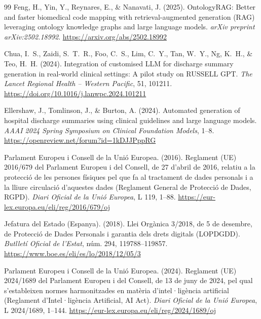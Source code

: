 \documentclass[CAT]{TFUOC}%
\begin{document}
\begin{thebibliography}{99}
Feng, H., Yin, Y., Reynares, E., \& Nanavati, J. (2025).
\newblock OntologyRAG: Better and faster biomedical code mapping with retrieval-augmented generation (RAG) leveraging ontology knowledge graphs and large language models.
\newblock \textit{arXiv preprint arXiv:2502.18992}.
\newblock \url{https://arxiv.org/abs/2502.18992}


Chua, I.~S., Zaidi, S.~T.~R., Foo, C.~S., Lim, C.~Y.,
Tan, W.~Y., Ng, K.~H., \& Teo, H.~H. (2024).
\newblock Integration of customised LLM for discharge summary
generation in real-world clinical settings: A pilot study
on RUSSELL GPT.
\newblock \textit{The Lancet Regional Health -- Western
Pacific}, 51, 101211.
\newblock \url{https://doi.org/10.1016/j.lanwpc.2024.101211}

Ellershaw, J., Tomlinson, J., \& Burton, A. (2024).
\newblock Automated generation of hospital discharge summaries
using clinical guidelines and large language models.
\newblock \textit{AAAI 2024 Spring Symposium on Clinical
Foundation Models}, 1--8.
\newblock \url{https://openreview.net/forum?id=1kDJJPppRG}


Parlament Europeu i Consell de la Unió Europea. (2016).
\newblock Reglament (UE) 2016/679 del Parlament Europeu i del Consell, de 27 d'abril de 2016, relatiu a la protecció de les persones físiques pel que fa al tractament de dades personals i a la lliure circulació d'aquestes dades (Reglament General de Protecció de Dades, RGPD).
\newblock \textit{Diari Oficial de la Unió Europea}, L 119, 1--88.
\newblock \url{https://eur-lex.europa.eu/eli/reg/2016/679/oj}

Jefatura del Estado (Espanya). (2018).
\newblock Llei Orgànica 3/2018, de 5 de desembre, de Protecció de Dades Personals i garantia dels drets digitals (LOPDGDD).
\newblock \textit{Butlletí Oficial de l'Estat}, núm. 294, 119788--119857.
\newblock \url{https://www.boe.es/eli/es/lo/2018/12/05/3}

Parlament Europeu i Consell de la Unió Europea. (2024).
\newblock Reglament (UE) 2024/1689 del Parlament Europeu i del Consell, de 13 de juny de 2024, pel qual s'estableixen normes harmonitzades en matèria d'intel·ligència artificial (Reglament d'Intel·ligència Artificial, AI Act).
\newblock \textit{Diari Oficial de la Unió Europea}, L 2024/1689, 1--144.
\newblock \url{https://eur-lex.europa.eu/eli/reg/2024/1689/oj}


\end{thebibliography}
\end{document}
